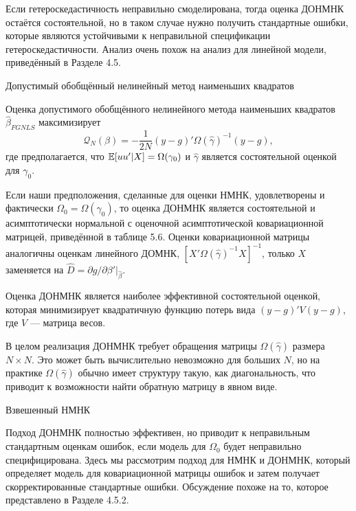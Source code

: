 Если гетероскедастичность неправильно смоделирована, тогда оценка ДОНМНК остаётся состоятельной, но в таком случае нужно получить стандартные ошибки, которые являются устойчивыми к неправильной спецификации гетероскедастичности. Анализ очень похож на анализ для линейной модели, приведённый в Разделе 4.5.

\begin{center}
Допустимый обобщённый нелинейный метод наименьших квадратов
\end{center}

Оценка допустимого обобщённого нелинейного метода наименьших квадратов $\hat{\beta}_{FGNLS}$ максимизирует
\begin{equation}
\mathcal{Q}_{N}(\beta)=-\frac{1}{2N}(y-g)' \Omega(\hat{\gamma})^{-1} (y-g),
\end{equation}
где предполагается, что $\mathbb{E}[uu'|X]=\Omega(\gamma_0)$ и $\hat{\gamma}$ является состоятельной оценкой для $\gamma_0$.

Если наши предположения, сделанные для оценки НМНК, удовлетворены и фактически $\Omega_0=\Omega(\gamma_0)$, то оценка ДОНМНК является состоятельной и асимптотически нормальной с оценочной асимптотической ковариационной матрицей, приведённой в таблице 5.6. Оценки ковариационной матрицы аналогичны оценкам линейного ДОМНК, $[X'\Omega(\hat{\gamma})^{-1}X]^{-1}$, только $X$ заменяется на $\hat{D}=\partial g / \partial \beta'|_{\hat{\beta}}$. 

Оценка ДОНМНК является наиболее эффективной состоятельной оценкой, которая минимизирует
квадратичную функцию потерь вида $(y-g)'V(y-g)$, где $V$ --- матрица весов. 

В целом реализация ДОНМНК требует обращения матрицы $\Omega(\hat{\gamma})$ размера $N \times N$. Это может быть вычислительно невозможно для больших $N$, но на практике $\Omega(\hat{\gamma})$ обычно имеет структуру такую, как диагональность, что приводит к возможности найти обратную матрицу в явном виде.

\begin{center}
Взвешенный НМНК
\end{center}

Подход ДОНМНК полностью эффективен, но приводит к неправильным стандартным оценкам ошибок, если модель для $\Omega_0$ будет неправильно специфицирована. Здесь мы рассмотрим подход для НМНК и ДОНМНК, который определяет модель для ковариационной матрицы ошибок и затем получает скорректированные стандартные ошибки. Обсуждение похоже на то, которое представлено в Разделе 4.5.2.

